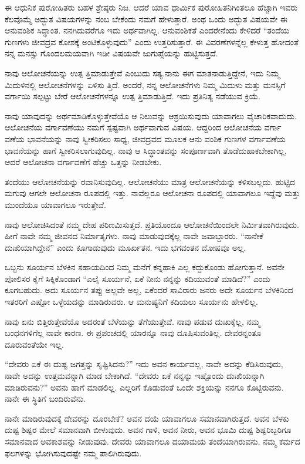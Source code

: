 ಈ ಆಧುನಿಕ ಪುರೋಹಿತರು ಬಹಳ ಶ್ರೇಷ್ಠರು ನಿಜ. ಆದರೆ ಯಾವ ಧಾರ್ಮಿಕ ಪುರೋಹಿತನಿಗಿಂತಲೂ ಹೆಚ್ಚಾಗಿ ಇವರು ಕೆಲವೊಮ್ಮೆ ಅದ್ಭುತ ವಿಷಯಗಳನ್ನು ನಂಬ ಬೇಕೆಂದು ನಮಗೆ ಹೇಳುತ್ತಾರೆ. ಅಂಥ ಒಂದು ಅದ್ಭುತ ವಿಷಯವೇ ಈ ಆನುವಂಶಿಕ ಸಿದ್ಧಾಂತ. ನನಗಿದುವರೆಗೂ ಇದು ಅರ್ಥವಾಗಿಲ್ಲ. ಆನುವಂಶಿಕತೆ ಎಂದರೇನೆಂದು ಕೇಳಿದರೆ “ತಂದೆಯ ಗುಣಗಳು ಜೀವದ್ರವ ಕೋಶಕ್ಕೆ ಅಂಟಿಕೊಳ್ಳುವುದು” ಎಂದು ಉತ್ತರಿಸುತ್ತಾರೆ. ಈ ವಿವರಣೆಗಳನ್ನೆಲ್ಲ ಕೇಳುತ್ತ ಹೋದಂತೆ ನನ್ನ ಮನಸ್ಸು ಗೊಂದಲಮಯವಾಗಿ ಇಡೀ ವಿಷಯವೇ ಜುಗುಪ್ಸೆಯನ್ನು ಹುಟ್ಟಿಸುತ್ತದೆ.

ನಾವು ಆಲೋಚನೆಯನ್ನು ಉತ್ಪ ತ್ತಿಮಾಡುತ್ತೇವೆ ಎಂಬುದು ಸತ್ಯ.ನಾನು ಈಗ ಮಾತನಾಡುತ್ತಿದ್ದೇನೆ, ಇದು ನಿಮ್ಮ ಮಿದುಳಿನಲ್ಲಿ ಆಲೋಚನೆಗಳನ್ನು ಏಳಿಸು ತ್ತಿದೆ. ಅಂದರೆ, ನನ್ನ ಆಲೋಚನೆಗಳು ನಿಮ್ಮ ಮಿದುಳು ಮತ್ತು ಮನಸ್ಸಿಗೆ ವರ್ಗಾಯಿ ಸಲ್ಪಟ್ಟು ಬೇರೆ ಆಲೋಚನೆಗಳನ್ನೂ ಉತ್ಪ ತ್ತಿಮಾಡುತ್ತಿದೆ. ಇದು ಪ್ರತಿನಿತ್ಯ ನಡೆಯುವ ಕ್ರಿಯೆ.

ನಾವು ಯಾವುದನ್ನು ಅರ್ಥಮಾಡಿಕೊಳ್ಳುತ್ತೇವೆಯೊ ಆ ನಿಲುವನ್ನು ಆಶ್ರಯಿಸುವುದು ಯಾವಾಗಲು ವೈಚಾರಿಕವಾದುದು. ಆಲೋಚನೆಯ ವರ್ಗಾವಣೆಯು ನಮಗೆ ಸ್ಪಷ್ಟವಾಗಿ ಅರ್ಥವಾಗುವ ವಿಷಯ. ಆದ್ದರಿಂದ ಆಲೋಚನೆಯ ವರ್ಗಾ ವಣೆಯ ಭಾವನೆಯನ್ನು ನಾವು ಸ್ವೀಕರಿಸಲು ಸಾಧ್ಯ, ಜೀವದ್ರವದ ಮೂಲಕ ಆನು ವಂಶಿಕ ಗುಣಗಳ ವರ್ಗಾವಣೆಯ ಭಾವನೆಯನ್ನು ಹಾಗೆ ಸ್ವೀಕರಿಸಲಾಗುವುದಿಲ್ಲ. ನಾವು ಆ ಸಿದ್ಧಾಂತವನ್ನು ಸಂಪೂರ್ಣವಾಗಿ ತೊಡೆದುಹಾಕಬೇಕಾಗಿಲ್ಲ, ಆದರೆ ಆಲೋಚನಾ ವರ್ಗಾವಣೆಗೆ ಹೆಚ್ಚು ಒತ್ತನ್ನು ನೀಡಬೇಕು.

ತಂದೆಯು ಆಲೋಚನೆಯನ್ನು ರವಾನಿಸುವುದಿಲ್ಲ. ಆಲೋಚನೆಯು ಮಾತ್ರ ಆಲೋಚನೆಯನ್ನು ಕಳಿಸಬಲ್ಲದು. ಹುಟ್ಟಿದ ಮಗುವು ಆಗಲೇ ಆಲೋಚನಾ ರೂಪದಲ್ಲಿ ಇತ್ತು. ನಾವೆಲ್ಲರೂ ಆಲೋಚನಾ ರೂಪದಲ್ಲಿ ಯಾವಾಗಲೂ ಇದ್ದೆವು ಮತ್ತು ಮುಂದೆಯೂ ಯಾವಾಗಲೂ ಇರುತ್ತೇವೆ.

ನಾವು ಆಲೋಚಿಸಿದಂತೆ ನಮ್ಮ ದೇಹ ಪರಿಣಮಿಸುತ್ತದೆ. ಪ್ರತಿಯೊಂದೂ ಆಲೋಚನೆಯಿಂದಲೇ ನಿರ್ಮಿತವಾಗಿರುವುದು. ಹೀಗೆ ನಾವೇ ನಮ್ಮ ಜೀವನದ ನಿರ್ಮಾತೃಗಳು. ನಾವು ಮಾಡುವುದಕ್ಕೆಲ್ಲ ನಾವೇ ಜವಾಬ್ದಾರರು. “ನಾನೇಕೆ ದುಃಖಿಯಾಗಿದ್ದೇನೆ” ಎಂದು ಕೂಗಾಡುವುದು ಮೂರ್ಖತನ. ಇದು ಭಗವಂತನ ದೋಷವೂ ಅಲ್ಲ.

ಒಬ್ಬನು ಸೂರ್ಯನ ಬೆಳಕಿನ ಸಹಾಯದಿಂದ ನಿಮ್ಮ ಮನೆಗೆ ಕನ್ನಹಾಕಿ ಎಲ್ಲ ಕದ್ದುಕೊಂಡು ಹೋಗುತ್ತಾನೆ. ಅವನೇ ಪೋಲಿಸರ ಕೈಗೆ ಸಿಕ್ಕಿಕೊಂಡಾಗ “ಎಲೈ ಸೂರ್ಯನೆ, ಏಕೆ ನೀನು ನನ್ನನ್ನು ಕದಿಯುವಂತೆ ಮಾಡಿದೆ?” ಎಂದು ಕೂಗಬಹುದು. ಅದು ಸೂರ್ಯನ ತಪ್ಪು ಅಲ್ಲವೇ ಅಲ್ಲ, ಏಕೆಂದರೆ ಸಾವಿರಾರು ಜನರು ಅದೇ ಸೂರ್ಯನ ಬೆಳಕಿನಿಂದ ಇತರರಿಗೆ ಎಷ್ಟೋ ಒಳ್ಳೆಯದನ್ನು ಮಾಡಿರುವರು. ಆ ಮನುಷ್ಯನಿಗೆ ಕದಿಯಲು ಸೂರ್ಯನು ಹೇಳಲಿಲ್ಲ.

ನಾವು ಏನು ಬಿತ್ತಿರುತ್ತೇವೆಯೊ ಅದರಂತೆ ಬೆಳೆಯನ್ನು ತೆಗೆಯುತ್ತೇವೆ. ನಾವು ಪಡುವ ದುಃಖಕ್ಕೆಲ್ಲ, ನಮ್ಮ ಬಂಧನಗಳಿಗೆಲ್ಲ ನಾವೇ ಕಾರಣ. ಈ ಪ್ರಪಂಚದಲ್ಲಿ ಯಾರನ್ನೂ ನಾವು ದೂಷಿಸುವಂತಿಲ್ಲ. ದೇವರನ್ನಂತೂ ದೂರುವಂತೆಯೇ ಇಲ್ಲ.

“ದೇವರು ಏಕೆ ಈ ದುಷ್ಟ ಜಗತ್ತನ್ನು ಸೃಷ್ಟಿಸಿದನು?” ಇದು ಅವನ ಕಾರ್ಯವಲ್ಲ, ನಾವೇ ಅದನ್ನು ಕೆಡಿಸಿರುವುದು, ನಾವೇ ಅದನ್ನು ಉತ್ತಮವನ್ನಾಗಿ ಮಾಡ ಬೇಕಾಗಿದೆ. “ದೇವರು ಏಕೆ ನನ್ನನ್ನು ಇಷ್ಟೊಂದು ದುಃಖಿಯನ್ನಾಗಿ ಮಾಡಿರುವನು?” ಅವನು ಹಾಗೆ ಮಾಡಲಿಲ್ಲ. ಎಲ್ಲರಿಗೆ ಕೊಡುವಂತೆ ಒಂದೇ ಶಕ್ತಿಯನ್ನು ನನಗೂ ಕೊಟ್ಟಿರುವನು. ನಾನೇ ಈ ಸ್ಥಿತಿಗೆ ಬಂದಿರುವೆನು.

ನಾನೇ ಮಾಡಿರುವುದಕ್ಕೆ ದೇವರನ್ನು ದೂರಬೇಕೆ? ಅವನ ದಯೆ ಯಾವಾಗಲೂ ಸಮಾನವಾಗಿರುತ್ತದೆ. ಅವನ ಬೆಳಕು ದುಷ್ಟ ಶಿಷ್ಟರ ಮೇಲೆ ಸಮಾನವಾಗಿ ಬೀಳುವುದು. ಅವನ ಗಾಳಿ, ಅವನ ನೀರು, ಅವನ ಭೂಮಿ ದುಷ್ಟ ಶಿಷ್ಟರಿಬ್ಬರಿಗೂ ಸಮಾನವಾದ ಅವಕಾಶವನ್ನು ನೀಡುವುವು. ದೇವರು ಯಾವಾಗಲೂ ದಯಾಮಯ ತಂದೆಯಾಗಿರುವನು. ನಮ್ಮ ಕರ್ಮದ ಫಲಗಳನ್ನು ಭೋಗಿಸುವುದಷ್ಟೇ ನಮ್ಮ ಪಾಲಿಗಿರುವುದು.

